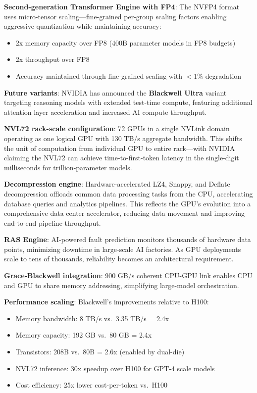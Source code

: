 \documentclass{article}
\begin{document}
\textbf{Second-generation Transformer Engine with FP4}: The NVFP4 format uses micro-tensor scaling—fine-grained per-group scaling factors enabling aggressive quantization while maintaining accuracy:
\begin{itemize}
\item 2x memory capacity over FP8 (400B parameter models in FP8 budgets)
\item 2x throughput over FP8
\item Accuracy maintained through fine-grained scaling with $<$1\% degradation
\end{itemize}

\textbf{Future variants}: NVIDIA has announced the \textbf{Blackwell Ultra} variant targeting reasoning models with extended test-time compute, featuring additional attention layer acceleration and increased AI compute throughput.

\textbf{NVL72 rack-scale configuration}: 72 GPUs in a single NVLink domain operating as one logical GPU with 130 TB/s aggregate bandwidth. This shifts the unit of computation from individual GPU to entire rack—with NVIDIA claiming the NVL72 can achieve time-to-first-token latency in the single-digit milliseconds for trillion-parameter models.

\textbf{Decompression engine}: Hardware-accelerated LZ4, Snappy, and Deflate decompression offloads common data processing tasks from the CPU, accelerating database queries and analytics pipelines. This reflects the GPU's evolution into a comprehensive data center accelerator, reducing data movement and improving end-to-end pipeline throughput.

\textbf{RAS Engine}: AI-powered fault prediction monitors thousands of hardware data points, minimizing downtime in large-scale AI factories. As GPU deployments scale to tens of thousands, reliability becomes an architectural requirement.

\textbf{Grace-Blackwell integration}: 900 GB/s coherent CPU-GPU link enables CPU and GPU to share memory addressing, simplifying large-model orchestration.

\textbf{Performance scaling}: Blackwell's improvements relative to H100:
\begin{itemize}
\item Memory bandwidth: 8 TB/s vs.\ 3.35 TB/s = 2.4x
\item Memory capacity: 192 GB vs.\ 80 GB = 2.4x
\item Transistors: 208B vs.\ 80B = 2.6x (enabled by dual-die)
\item NVL72 inference: 30x speedup over H100 for GPT-4 scale models \cite{nvidia2024blackwellperf}
\item Cost efficiency: 25x lower cost-per-token vs.\ H100 \cite{nvidia2024blackwellperf}
\end{itemize}
\end{document}
